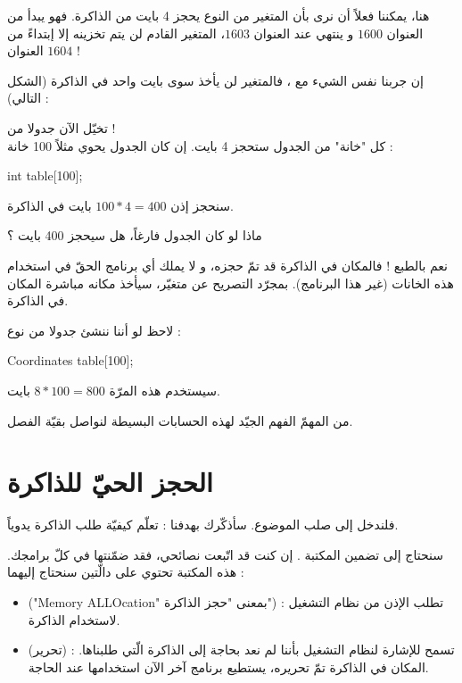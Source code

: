 
هنا، يمكننا فعلاً أن نرى بأن المتغير
من النوع
يحجز 4 بايت من الذاكرة.
فهو يبدأ من العنوان
$1600$
و ينتهي عند العنوان
$1603$،
المتغير القادم لن يتم تخزينه إلا إبتداءً من العنوان
$1604$ !

إن جربنا نفس الشيء مع
،
فالمتغير لن يأخذ سوى بايت واحد في الذاكرة (الشكل التالي) :


تخيّل الآن جدولا من
 !\\
كل "خانة" من الجدول ستحجز 4 بايت. إن كان الجدول يحوي مثلاً  100 خانة :

\begin{Csource}
int table[100];
\end{Csource}

سنحجز إذن
$100 * 4 = 400$
بايت في الذاكرة.

\begin{question}
ماذا لو كان الجدول فارغاً، هل سيحجز 400 بايت ؟
\end{question}

نعم بالطبع ! فالمكان  في الذاكرة قد تمّ حجزه، و لا يملك أي برنامج الحقّ في استخدام هذه الخانات (غير هذا البرنامج). بمجرّد التصريح عن متغيّر، سيأخذ مكانه مباشرة المكان في الذاكرة.

لاحظ لو أننا ننشئ جدولا من نوع
 :

\begin{Csource}
Coordinates table[100];
\end{Csource}

سيستخدم هذه المرّة
$8 * 100 = 800$
بايت.

من المهمّ الفهم الجيّد لهذه الحسابات البسيطة لنواصل بقيّة الفصل.

\section{الحجز الحيّ للذاكرة}
فلندخل إلى صلب الموضوع. سأذكّرك بهدفنا : تعلّم كيفيّة طلب الذاكرة يدوياً.

سنحتاج إلى تضمين المكتبة
.
إن كنت قد اتّبعت نصائحي، فقد ضمّنتها في كلّ برامجك. هذه المكتبة تحتوي على دالّتين سنحتاج إليهما :
\begin{itemize}
  \item {} ("\textenglish{Memory ALLOcation}"
بمعنى "حجز الذاكرة") : تطلب الإذن من نظام التشغيل لاستخدام الذاكرة.
  \item {}
(تحرير) : تسمح للإشارة لنظام التشغيل بأننا لم نعد بحاجة إلى الذاكرة الّتي طلبناها. المكان في الذاكرة تمّ تحريره، يستطيع برنامج آخر الآن استخدامها عند الحاجة.
\end{itemize}

